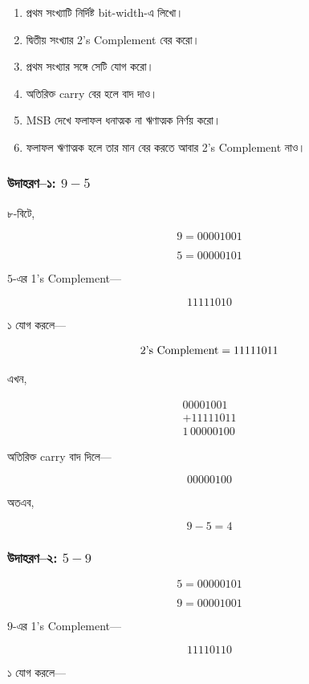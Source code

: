 \begin{enumerate}
    \item প্রথম সংখ্যাটি নির্দিষ্ট \textenglish{bit-width}-এ লিখো।
    \item দ্বিতীয় সংখ্যার \textenglish{2's Complement} বের করো।
    \item প্রথম সংখ্যার সঙ্গে সেটি যোগ করো।
    \item অতিরিক্ত \textenglish{carry} বের হলে বাদ দাও।
    \item \textenglish{MSB} দেখে ফলাফল ধনাত্মক না ঋণাত্মক নির্ণয় করো।
    \item ফলাফল ঋণাত্মক হলে তার মান বের করতে আবার
    \textenglish{2's Complement} নাও।
\end{enumerate}
\par\endgroup


\subsubsection*{উদাহরণ--১: $9-5$}

৮-বিটে,

\[
9=00001001
\]

\[
5=00000101
\]

$5$-এর \textenglish{1's Complement}—

\[
11111010
\]

১ যোগ করলে—

\[
\text{\textenglish{2's Complement}}=11111011
\]

এখন,

\[
\begin{array}{r}
00001001\\
+11111011\\
\hline
1\,00000100
\end{array}
\]

অতিরিক্ত \textenglish{carry} বাদ দিলে—

\[
00000100
\]

অতএব,

\[
\boxed{9-5=4}
\]

\subsubsection*{উদাহরণ--২: $5-9$}

\[
5=00000101
\]

\[
9=00001001
\]

$9$-এর \textenglish{1's Complement}—

\[
11110110
\]

১ যোগ করলে—

